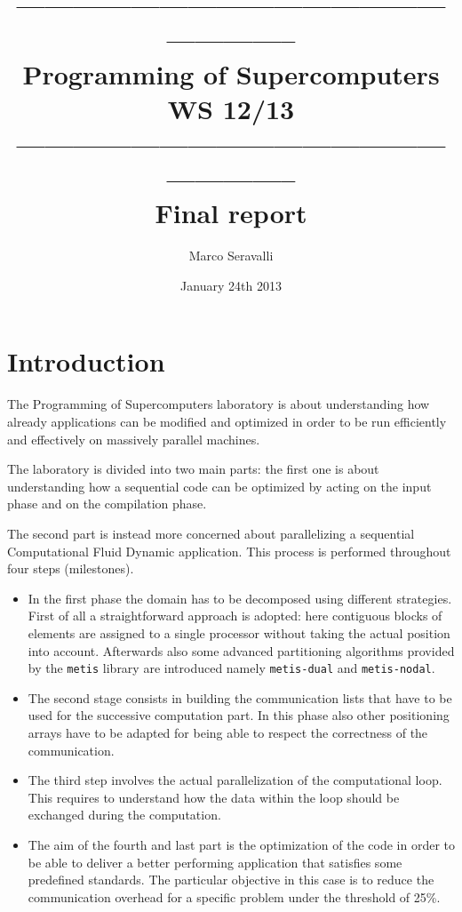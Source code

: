 \documentclass[12pt, a4paper]{article}
\title{----------------------------------------------------------- \\
        {\bf Programming of Supercomputers WS 12/13}\\ 
        ----------------------------------------------------------- \\ 
        Final report}
\author{Marco Seravalli}
\date{January 24th 2013}
\begin{document}
  \maketitle

\section{Introduction}
The Programming of Supercomputers laboratory is about understanding how already
applications can be modified and optimized in order to be run efficiently and
effectively on massively parallel machines.

The laboratory is divided into two main parts: the first one is about
understanding how a sequential code can be optimized by acting on the input
phase and on the compilation phase.

The second part is instead more concerned about parallelizing a sequential
Computational Fluid Dynamic application. This process is performed throughout 
four steps (milestones).
\begin{itemize}
  \item In the first phase the domain has to be decomposed using different 
        strategies. First of all a straightforward approach is adopted: here 
        contiguous blocks of elements are assigned to a single processor without
        taking the actual position into account. Afterwards also some advanced
        partitioning algorithms provided by the \verb=metis= library are
        introduced namely \verb=metis-dual= and \verb=metis-nodal=.
  \item The second stage consists in building the communication lists that have 
        to be used for the successive computation part. In this phase also other 
        positioning arrays have to be adapted for being able to respect the 
        correctness of the communication.
  \item The third step involves the actual parallelization of the computational
        loop. This requires to understand how the data within the loop should be
        exchanged during the computation.
  \item The aim of the fourth and last part is the optimization of the code in
        order to be able to deliver a better performing application that
        satisfies some predefined standards. The particular objective in this
        case is to reduce the communication overhead for a specific problem 
        under the threshold of 25\%. 
\end{itemize}
\end{document}
